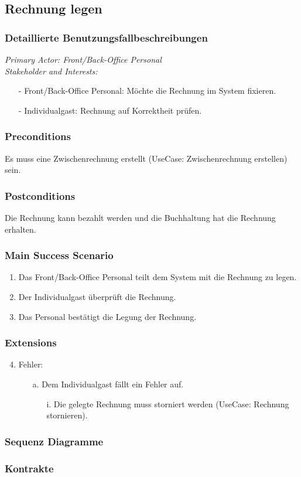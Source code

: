 \documentclass[./detailed_overview_usecases.tex]{subfiles}
\begin{document}
    \subsection{Rechnung legen}
    \subsubsection{Detaillierte Benutzungsfallbeschreibungen}
    \textit{Primary Actor: Front/Back-Office Personal}
    \\
    \textit{Stakeholder and Interests:}
    \begin{itemize}
        \item[-] Front/Back-Office Personal: Möchte die Rechnung im System fixieren.
		\item[-] Individualgast: Rechnung auf Korrektheit prüfen.
    \end{itemize}

    \subsubsection*{Preconditions}
    Es muss eine Zwischenrechnung erstellt (UseCase: Zwischenrechnung erstellen) sein.

    \subsubsection*{Postconditions}
    Die Rechnung kann bezahlt werden und die Buchhaltung hat die Rechnung erhalten.

    \subsubsection*{Main Success Scenario}
    \begin{enumerate}
        \item Das Front/Back-Office Personal teilt dem System mit die Rechnung zu legen.
        \item Der Individualgast überprüft die Rechnung.
        \item Das Personal bestätigt die Legung der Rechnung.
    \end{enumerate}

    \subsubsection*{Extensions}
    \begin{enumerate}
        \setcounter{enumi}{3}
        \item Fehler:
        \begin{itemize}
            \item[a.] Dem Individualgast fällt ein Fehler auf.
            \begin{itemize}
                \item[i.] Die gelegte Rechnung muss storniert werden (UseCase: Rechnung stornieren).
            \end{itemize}
        \end{itemize}
    \end{enumerate}
    \subsubsection{Sequenz Diagramme}
    \subsubsection{Kontrakte}
\end{document}
